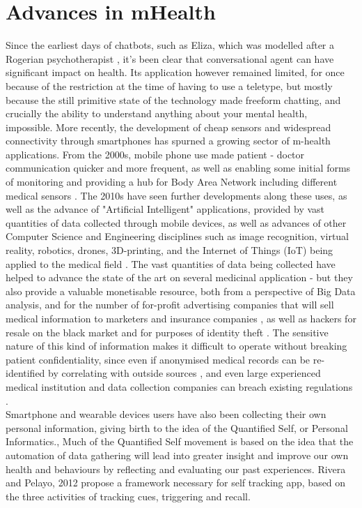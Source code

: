 \section{Advances in mHealth}
Since the earliest days of chatbots, such as Eliza, which was modelled after a Rogerian psychotherapist \cite{weizenbaum1966eliza}, it's been clear that conversational agent can have significant impact on health. Its application however remained limited, for once because of the restriction at the time of having to use a teletype, but mostly because the still primitive state of the technology made freeform chatting, and crucially the ability to understand anything about your mental health, impossible. More recently, the development of cheap sensors and widespread connectivity through smartphones has spurned a growing sector of m-health applications. From the 2000s, mobile phone use made patient - doctor communication quicker and more frequent, as well as enabling some initial forms of monitoring and providing a hub for Body Area Network including different medical sensors \cite{Patrick2008}. The 2010s have seen further developments along these uses, as well as the advance of "Artificial Intelligent" applications, provided by vast quantities of data collected through mobile devices, as well as advances of other Computer Science and Engineering disciplines such as image recognition, virtual reality, robotics, drones, 3D-printing, and the Internet of Things (IoT) being applied to the medical field \cite{Pistorius2017}. The vast quantities of data being collected have helped to advance the state of the art on several medicinal application - but they also provide a valuable monetisable resource, both from a perspective of Big Data analysis, and for the number of for-profit advertising companies that will sell medical information to marketers and insurance companies \cite{tanner2016}, as well as hackers for resale on the black market and for purposes of identity theft \cite{hackercare}. The sensitive nature of this kind of information makes it difficult to operate without breaking patient confidentiality, since even if anonymised medical records can be re-identified by correlating with outside sources \cite{Sweeney2001}, and even large experienced medical institution and data collection companies can breach existing regulations \cite{deepmindnhs}. \\
Smartphone and wearable devices users have also been collecting their own personal information, giving birth to the idea of the Quantified Self, or Personal Informatics., 
Much of the Quantified Self movement is based on the idea that the automation of data gathering will lead into greater insight and improve our own health and behaviours by reflecting and evaluating our past experiences. Rivera and Pelayo, 2012 \cite{Rivera-Pelayo2012} propose a framework necessary for self tracking app, based on the three activities of tracking cues, triggering and recall.
